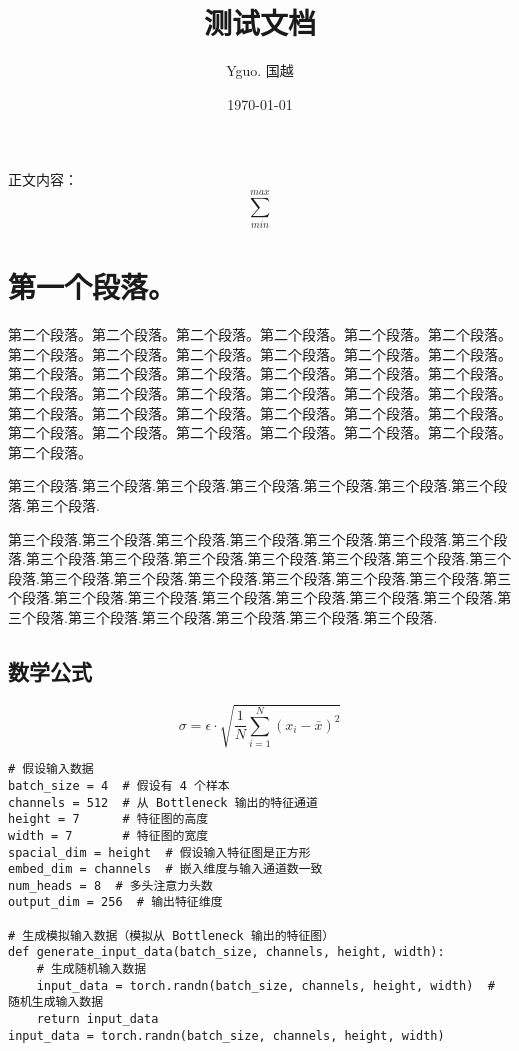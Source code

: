 \documentclass{article}
\begin{document}
\title{测试文档}
\author{Yguo. 国越}
\date{\today}
\maketitle

\tableofcontents

正文内容： $$\sum_{min}^{max}$$

\section{第一个段落。}
\begin{center}
    
第二个段落。第二个段落。第二个段落。第二个段落。第二个段落。第二个段落。第二个段落。第二个段落。第二个段落。第二个段落。第二个段落。第二个段落。第二个段落。第二个段落。第二个段落。第二个段落。第二个段落。第二个段落。第二个段落。第二个段落。第二个段落。第二个段落。第二个段落。第二个段落。第二个段落。第二个段落。第二个段落。第二个段落。第二个段落。第二个段落。第二个段落。第二个段落。第二个段落。第二个段落。第二个段落。第二个段落。第二个段落。

第三个段落.第三个段落.第三个段落.第三个段落.第三个段落.第三个段落.第三个段落.第三个段落.\par
第三个段落.第三个段落.第三个段落.第三个段落.第三个段落.第三个段落.第三个段落.第三个段落.第三个段落.第三个段落.第三个段落.第三个段落.第三个段落.第三个段落.第三个段落.第三个段落.第三个段落.第三个段落.第三个段落.第三个段落.第三个段落.第三个段落.第三个段落.第三个段落.第三个段落.第三个段落.第三个段落.第三个段落.第三个段落.第三个段落.第三个段落.第三个段落.第三个段落.
\end{center}
\subsection{数学公式}
$$
\sigma  = \epsilon \cdot \sqrt{\frac{1}{N} \sum_{i=1}^{N} (x_i - \bar{x})^2}
$$
\begin{verbatim}
# 假设输入数据
batch_size = 4  # 假设有 4 个样本
channels = 512  # 从 Bottleneck 输出的特征通道
height = 7      # 特征图的高度
width = 7       # 特征图的宽度
spacial_dim = height  # 假设输入特征图是正方形
embed_dim = channels  # 嵌入维度与输入通道数一致
num_heads = 8  # 多头注意力头数
output_dim = 256  # 输出特征维度
    
# 生成模拟输入数据（模拟从 Bottleneck 输出的特征图）
def generate_input_data(batch_size, channels, height, width):
    # 生成随机输入数据
    input_data = torch.randn(batch_size, channels, height, width)  # 随机生成输入数据
    return input_data
input_data = torch.randn(batch_size, channels, height, width) 
\end{verbatim}
\end{document}
